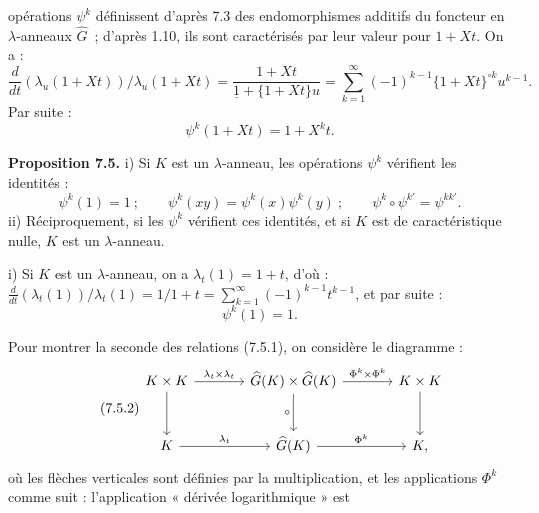 opérations \(\psi^k\)
définissent d'après 7.3 des endomorphismes additifs du foncteur en \(\lambda\)-anneaux \(\widehat G\)~; d'après 1.10, ils sont caractérisés par leur valeur pour \(1+Xt\). On a :
\[
  \frac{d}{dt}(\lambda_u(1+Xt))/\lambda_u(1+Xt)
  =
  \frac{1+Xt}{\underline{1}+\{1+Xt\}u}
  =
  \sum_{k=1}^{\infty}(-1)^{k-1}\{1+Xt\}^{\circ k}u^{k-1}.
\]
Par suite :
\begin{equation}\tag{7.4.1}
  \psi^k(1+Xt)=1+X^k t.
\end{equation}

\textbf{Proposition 7.5.} i) Si \(K\) est un \(\lambda\)-anneau, les opérations \(\psi^k\) vérifient les identités :
\begin{equation}\tag{7.5.1}
  \psi^k(1)=1~;\qquad
  \psi^k(xy)=\psi^k(x)\psi^k(y)~;\qquad
  \psi^k\circ\psi^{k'}=\psi^{kk'}.
\end{equation}
ii) Réciproquement, si les \(\psi^k\) vérifient ces identités, et si \(K\) est de caractéristique nulle, \(K\) est un \(\lambda\)-anneau.

i) Si \(K\) est un \(\lambda\)-anneau, on a \(\lambda_t(1)=1+t\), d'où : \(\frac{d}{dt}(\lambda_t(1))/\lambda_t(1)=1/1+t=\sum_{k=1}^{\infty}(-1)^{k-1}t^{k-1}\), et par suite :
\[
  \psi^k(1)=1.
\]

Pour montrer la seconde des relations (7.5.1), on considère le diagramme :
\begin{equation}\tag{7.5.2}
\begin{tikzcd}[column sep=large,row sep=large]
K\times K \arrow[r,"\lambda_t\times\lambda_t"] \arrow[d] &
\widehat G(K)\times\widehat G(K) \arrow[r,"\Phi^k\times\Phi^k"] \arrow[d,"\circ"'] &
K\times K \arrow[d]\\
K \arrow[r,"\lambda_t"] &
\widehat G(K) \arrow[r,"\Phi^k"] &
K ,
\end{tikzcd}
\end{equation}
où les flèches verticales sont définies par la multiplication, et les applications \(\Phi^k\) comme suit : l'application « dérivée logarithmique » est
